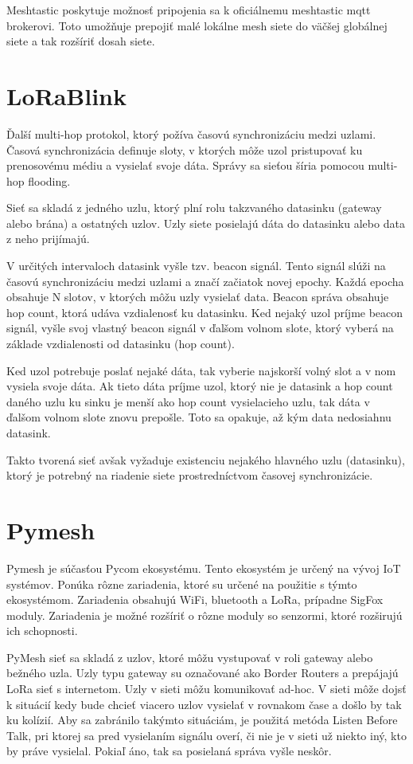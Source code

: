 \documentclass[slovak,master]{diploma}
\begin{document}
Meshtastic poskytuje možnosť pripojenia sa k oficiálnemu meshtastic mqtt brokerovi. Toto umožňuje prepojiť malé lokálne mesh siete do väčšej globálnej siete a 
tak rozšíriť dosah siete.

\section{LoRaBlink}
Ďalší multi-hop protokol, ktorý požíva časovú synchronizáciu medzi uzlami. Časová synchronizácia definuje sloty, v ktorých môže uzol pristupovať ku prenosovému médiu a 
vysielať svoje dáta. Správy sa sieťou šíria pomocou multi-hop flooding.

Sieť sa skladá z jedného uzlu, ktorý plní rolu takzvaného datasinku (gateway alebo brána) a ostatných uzlov. Uzly siete posielajú dáta do datasinku alebo data z neho prijímajú.

V určitých intervaloch datasink vyšle tzv. beacon signál. Tento signál slúži na časovú synchronizáciu medzi uzlami a značí začiatok novej epochy. 
Každá epocha obsahuje N slotov, v ktorých môžu uzly vysielať data. Beacon správa obsahuje hop count, ktorá udáva vzdialenosť ku datasinku.
Ked nejaký uzol príjme beacon signál, vyšle svoj vlastný beacon signál v ďalšom volnom slote, ktorý vyberá na základe vzdialenosti od datasinku (hop count).

Ked uzol potrebuje poslať nejaké dáta, tak vyberie najskorší volný slot a v nom vysiela svoje dáta. Ak tieto dáta príjme uzol, ktorý nie je datasink a 
hop count daného uzlu ku sinku je menší ako hop count vysielacieho uzlu, tak dáta v ďalšom volnom slote znovu prepošle. Toto sa opakuje, až 
kým data nedosiahnu datasink.

Takto tvorená sieť avšak vyžaduje existenciu nejakého hlavného uzlu (datasinku), ktorý je potrebný na riadenie siete prostredníctvom časovej synchronizácie.

\section{Pymesh}
Pymesh je súčasťou Pycom \cite{pycom} ekosystému. Tento ekosystém je určený na vývoj IoT systémov. Ponúka rôzne zariadenia, ktoré su určené na použitie s týmto 
ekosystémom. Zariadenia obsahujú WiFi, bluetooth a LoRa, prípadne SigFox moduly. Zariadenia je možné rozšíriť o rôzne moduly so senzormi, ktoré rozširujú ich schopnosti.

PyMesh sieť sa skladá z uzlov, ktoré môžu vystupovať v roli gateway alebo bežného uzla. Uzly typu gateway su označované ako Border Routers a prepájajú LoRa sieť s 
internetom. Uzly v sieti môžu komunikovať ad-hoc. V sieti môže dojsť k situácií kedy bude chcieť viacero uzlov vysielať v rovnakom čase a došlo by tak ku kolízií.
Aby sa zabránilo takýmto situáciám, je použitá metóda Listen Before Talk, pri ktorej sa pred vysielaním signálu overí, či nie je v sieti už niekto iný, kto by práve 
vysielal. Pokiaľ áno, tak sa posielaná správa vyšle neskôr.
\end{document}
